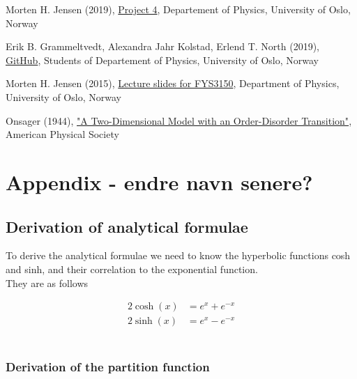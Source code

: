 \documentclass{article}
\begin{document}
\begin{thebibliography}{}

Morten H. Jensen (2019), \href{https://github.com/CompPhysics/ComputationalPhysics/blob/master/doc/Projects/2019/Project4/pdf/Project4.pdf}{Project 4}, Departement of Physics, University of Oslo, Norway

Erik B. Grammeltvedt, Alexandra Jahr Kolstad, Erlend T. North (2019), \href{https://github.com/Erikbgram/Fys3150}{GitHub}, Students of Departement of Physics, University of Oslo, Norway

Morten H. Jensen (2015), \href{https://github.com/CompPhysics/ComputationalPhysics/blob/master/doc/Lectures/lectures2015.pdf}{Lecture slides for FYS3150}, Department of Physics, University of Oslo, Norway

Onsager (1944), \href{https://journals.aps.org/pr/abstract/10.1103/PhysRev.65.117}{"A Two-Dimensional Model with an Order-Disorder Transition"}, American Physical Society


\end{thebibliography}


\vspace{1cm}


\appendix
\section{Appendix - endre navn senere?} \label{sec:Appendix}


\subsection{Derivation of analytical formulae}

To derive the analytical formulae we need to know the hyperbolic functions cosh and sinh, and their correlation to the exponential function. \\

They are as follows

\begin{align*}
    2 \cosh (x) &= e^x + e^{-x} \\
    2 \sinh (x) &= e^x - e^{-x}
\end{align*} \\


\subsubsection{Derivation of the partition function} \label{sec:derivationpartitionfunction}
\end{document}

